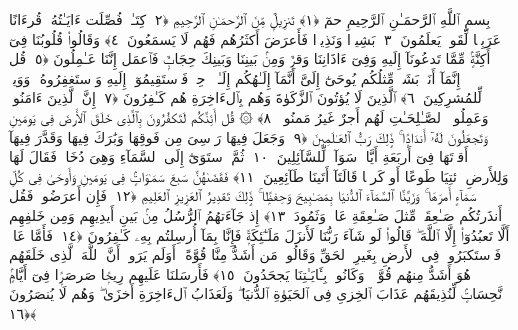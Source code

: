 
  
    
  
    
    

\nopagebreak
  بِسمِ ٱللَّهِ ٱلرَّحمَـٰنِ ٱلرَّحِيمِ
  حمٓ ﴿١﴾
 تَنزِيلٌۭ مِّنَ ٱلرَّحمَـٰنِ ٱلرَّحِيمِ ﴿٢﴾
 كِتَـٰبٌۭ فُصِّلَت ءَايَـٰتُهُۥ قُرءَانًا عَرَبِيًّۭا لِّقَومٍۢ يَعلَمُونَ ﴿٣﴾
 بَشِيرًۭا وَنَذِيرًۭا فَأَعرَضَ أَكثَرُهُم فَهُم لَا يَسمَعُونَ ﴿٤﴾
 وَقَالُوا۟ قُلُوبُنَا فِىٓ أَكِنَّةٍۢ مِّمَّا تَدعُونَآ إِلَيهِ وَفِىٓ ءَاذَانِنَا وَقرٌۭ وَمِنۢ بَينِنَا وَبَينِكَ حِجَابٌۭ فَٱعمَل إِنَّنَا عَـٰمِلُونَ ﴿٥﴾
 قُل إِنَّمَآ أَنَا۠ بَشَرٌۭ مِّثلُكُم يُوحَىٰٓ إِلَىَّ أَنَّمَآ إِلَـٰهُكُم إِلَـٰهٌۭ وَٟحِدٌۭ فَٱستَقِيمُوٓا۟ إِلَيهِ وَٱستَغفِرُوهُ ۗ وَوَيلٌۭ لِّلمُشرِكِينَ ﴿٦﴾
 ٱلَّذِينَ لَا يُؤتُونَ ٱلزَّكَوٰةَ وَهُم بِٱلءَاخِرَةِ هُم كَـٰفِرُونَ ﴿٧﴾
 إِنَّ ٱلَّذِينَ ءَامَنُوا۟ وَعَمِلُوا۟ ٱلصَّـٰلِحَـٰتِ لَهُم أَجرٌ غَيرُ مَمنُونٍۢ ﴿٨﴾
 ۞ قُل أَئِنَّكُم لَتَكفُرُونَ بِٱلَّذِى خَلَقَ ٱلأَرضَ فِى يَومَينِ وَتَجعَلُونَ لَهُۥٓ أَندَادًۭا ۚ ذَٟلِكَ رَبُّ ٱلعَـٰلَمِينَ ﴿٩﴾
 وَجَعَلَ فِيهَا رَوَٟسِىَ مِن فَوقِهَا وَبَٰرَكَ فِيهَا وَقَدَّرَ فِيهَآ أَقوَٟتَهَا فِىٓ أَربَعَةِ أَيَّامٍۢ سَوَآءًۭ لِّلسَّآئِلِينَ ﴿١٠﴾
 ثُمَّ ٱستَوَىٰٓ إِلَى ٱلسَّمَآءِ وَهِىَ دُخَانٌۭ فَقَالَ لَهَا وَلِلأَرضِ ٱئتِيَا طَوعًا أَو كَرهًۭا قَالَتَآ أَتَينَا طَآئِعِينَ ﴿١١﴾
 فَقَضَىٰهُنَّ سَبعَ سَمَـٰوَاتٍۢ فِى يَومَينِ وَأَوحَىٰ فِى كُلِّ سَمَآءٍ أَمرَهَا ۚ وَزَيَّنَّا ٱلسَّمَآءَ ٱلدُّنيَا بِمَصَـٰبِيحَ وَحِفظًۭا ۚ ذَٟلِكَ تَقدِيرُ ٱلعَزِيزِ ٱلعَلِيمِ ﴿١٢﴾
 فَإِن أَعرَضُوا۟ فَقُل أَنذَرتُكُم صَـٰعِقَةًۭ مِّثلَ صَـٰعِقَةِ عَادٍۢ وَثَمُودَ ﴿١٣﴾
 إِذ جَآءَتهُمُ ٱلرُّسُلُ مِنۢ بَينِ أَيدِيهِم وَمِن خَلفِهِم أَلَّا تَعبُدُوٓا۟ إِلَّا ٱللَّهَ ۖ قَالُوا۟ لَو شَآءَ رَبُّنَا لَأَنزَلَ مَلَـٰٓئِكَةًۭ فَإِنَّا بِمَآ أُرسِلتُم بِهِۦ كَـٰفِرُونَ ﴿١٤﴾
 فَأَمَّا عَادٌۭ فَٱستَكبَرُوا۟ فِى ٱلأَرضِ بِغَيرِ ٱلحَقِّ وَقَالُوا۟ مَن أَشَدُّ مِنَّا قُوَّةً ۖ أَوَلَم يَرَوا۟ أَنَّ ٱللَّهَ ٱلَّذِى خَلَقَهُم هُوَ أَشَدُّ مِنهُم قُوَّةًۭ ۖ وَكَانُوا۟ بِـَٔايَـٰتِنَا يَجحَدُونَ ﴿١٥﴾
 فَأَرسَلنَا عَلَيهِم رِيحًۭا صَرصَرًۭا فِىٓ أَيَّامٍۢ نَّحِسَاتٍۢ لِّنُذِيقَهُم عَذَابَ ٱلخِزىِ فِى ٱلحَيَوٰةِ ٱلدُّنيَا ۖ وَلَعَذَابُ ٱلءَاخِرَةِ أَخزَىٰ ۖ وَهُم لَا يُنصَرُونَ ﴿١٦﴾
